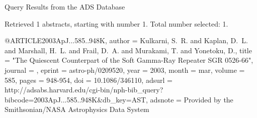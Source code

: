 Query Results from the ADS Database


Retrieved 1 abstracts, starting with number 1.  Total number selected: 1.

@ARTICLE{2003ApJ...585..948K,
   author = {{Kulkarni}, S.~R. and {Kaplan}, D.~L. and {Marshall}, H.~L. and 
	{Frail}, D.~A. and {Murakami}, T. and {Yonetoku}, D.},
    title = "{The Quiescent Counterpart of the Soft Gamma-Ray Repeater SGR 0526-66}",
  journal = {\apj},
   eprint = {astro-ph/0209520},
     year = 2003,
    month = mar,
   volume = 585,
    pages = {948-954},
      doi = {10.1086/346110},
   adsurl = {http://adsabs.harvard.edu/cgi-bin/nph-bib_query?bibcode=2003ApJ...585..948K&db_key=AST},
  adsnote = {Provided by the Smithsonian/NASA Astrophysics Data System}
}



